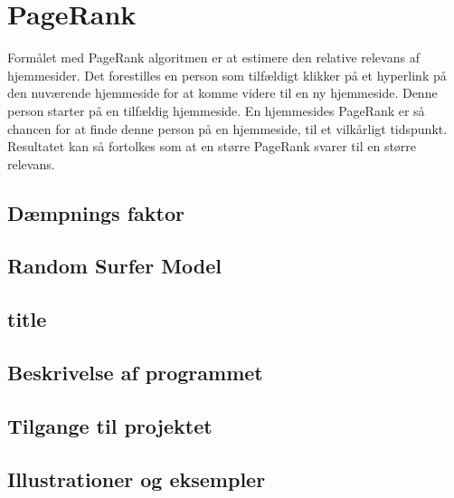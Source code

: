 
\section{PageRank}
Formålet med PageRank algoritmen er at estimere den relative relevans af hjemmesider. Det forestilles en person som tilfældigt klikker på et hyperlink på den nuværende hjemmeside for at komme videre til en ny hjemmeside. Denne person starter på en tilfældig hjemmeside. En hjemmesides PageRank er så chancen for at finde denne person på en hjemmeside, til et vilkårligt tidspunkt. Resultatet kan så fortolkes som at en større PageRank svarer til en større relevans.

\subsection*{Dæmpnings faktor}


\subsection*{Random Surfer Model}

\subsection*{title}

\subsection*{Beskrivelse af programmet}


\subsection*{Tilgange til projektet}

\subsection*{Illustrationer og eksempler}